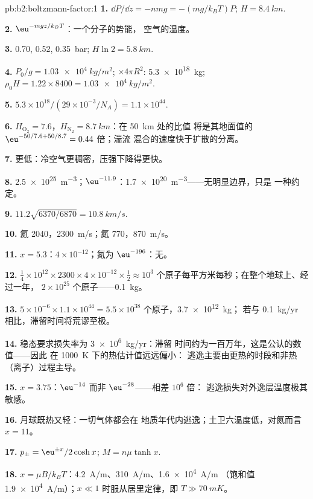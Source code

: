 \begin{solution}{pb:b2:boltzmann-factor:1}
\textbf{1.} $\dd P/\dd z = -nmg = -(mg/k_BT)P$; $H = \qty{8.4}{km}$.

\textbf{2.} $\eu^{-mgz/k_BT}$：一个分子的势能，
空气的温度。

\textbf{3.} \qty{0.70}{}, \qty{0.52}{}, \qty{0.35}{bar}; $H\ln 2 = \qty{5.8}{km}$.

\textbf{4.} $P_0/g = \qty{1.03e4}{kg/m^2}$; $\times 4\pi R^2$: \qty{5.3e18}{kg}; $\rho_0H =
1.22 \times 8400 = \qty{1.03e4}{kg/m^2}$.

\textbf{5.} $5.3 \times 10^{18}/(29 \times 10^{-3}/N_A) = 1.1 \times 10^{44}$.

\textbf{6.} $H_{\text{O}_2} = 7.6$，$H_{\text{N}_2} = \qty{8.7}{km}$：在 \qty{50}{km} 处的比值
将是其地面值的 $\eu^{-50/7.6 + 50/8.7} = 0.44$ 倍；湍流
混合的速度快于扩散的分离。

\textbf{7.} 更低：冷空气更稠密，压强下降得更快。

\textbf{8.} \qty{2.5e25}{m^{-3}}；$\eu^{-11.9}$：\qty{1.7e20}{m^{-3}}——无明显边界，只是
一种约定。

\textbf{9.} $11.2\sqrt{6370/6870} = \qty{10.8}{km/s}$.

\textbf{10.} 氦 \qty{2040}{}，\qty{2300}{m/s}；氮 \qty{770}{}，\qty{870}{m/s}。

\textbf{11.} $x = 5.3$：$4 \times 10^{-12}$；氮为 $\eu^{-196}$：无。

\textbf{12.} $\tfrac14 \times 10^{12} \times 2300 \times 4 \times 10^{-12} \times \tfrac12 \approx
10^3$ 个原子每平方米每秒；在整个地球上、经过一年，
$2 \times 10^{25}$ 个原子——\qty{0.1}{kg}。

\textbf{13.} $5 \times 10^{-6} \times 1.1 \times 10^{44} = 5.5 \times 10^{38}$ 个原子，\qty{3.7e12}{kg}；
若与 \qty{0.1}{kg/yr} 相比，滞留时间将荒谬至极。

\textbf{14.} 稳态要求损失率为 \qty{3e6}{kg/yr}：滞留
时间约为一百万年，这是公认的数值——因此
在 \qty{1000}{K} 下的热估计值远远偏小：
逃逸主要由更热的时段和非热（离子）过程主导。

\textbf{15.} $x = 3.75$：$\eu^{-14}$ 而非 $\eu^{-28}$——相差 $10^6$ 倍：
逃逸损失对外逸层温度极其敏感。

\textbf{16.} 月球既热又轻：一切气体都会在
地质年代内逃逸；土卫六温度低，对氮而言 $x = 11$。

\textbf{17.} $p_\pm = \eu^{\pm x}/2\cosh x$; $M = n\mu\tanh x$.

\textbf{18.} $x = \mu B/k_BT$：\qty{4.2}{A/m}、\qty{310}{A/m}、\qty{1.6e4}{A/m}
（饱和值 \qty{1.9e4}{A/m}）；$x \ll 1$ 时服从居里定律，即 $T \gg \qty{70}{mK}$。


\end{solution}
